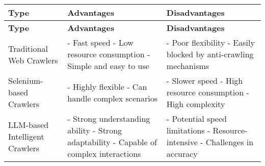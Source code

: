 \begin{longtable}{
    >{\raggedright\arraybackslash}m{}
    >{\raggedright\arraybackslash}m{}
    >{\raggedright\arraybackslash}m{}
}
    \hline
    \textbf{Type}                     & \textbf{Advantages} & \textbf{Disadvantages} \\
    \hline
    \endfirsthead

    \hline
    \textbf{Type}                     & \textbf{Advantages} & \textbf{Disadvantages} \\
    \hline
    \endhead

    \hline
    \endfoot

    \hline
    Traditional Web Crawlers          &
    - Fast speed\newline
    - Low resource consumption\newline
    - Simple and easy to use          &
    - Poor flexibility\newline
    - Easily blocked by anti-crawling mechanisms                                     \\
    \hline
    Selenium-based Crawlers           &
    - Highly flexible\newline
    - Can handle complex scenarios    &
    - Slower speed\newline
    - High resource consumption\newline
    - High complexity                                                                \\
    \hline
    LLM-based Intelligent Crawlers    &
    - Strong understanding ability\newline
    - Strong adaptability\newline
    - Capable of complex interactions &
    - Potential speed limitations\newline
    - Resource-intensive\newline
    - Challenges in accuracy                                                         \\
    \hline
\end{longtable}